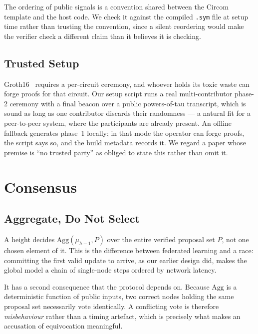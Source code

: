 \documentclass{llncs}
\begin{document}
The ordering of public signals is a convention shared between the Circom
template and the host code. We check it against the compiled \texttt{.sym} file
at setup time rather than trusting the convention, since a silent reordering
would make the verifier check a different claim than it believes it is checking.

\subsection{Trusted Setup}

Groth16~\cite{groth2016size} requires a per-circuit ceremony, and whoever holds
its toxic waste can forge proofs for that circuit. Our setup script runs a real
multi-contributor phase-2 ceremony with a final beacon over a public
powers-of-tau transcript, which is sound as long as one contributor discards
their randomness --- a natural fit for a peer-to-peer system, where the
participants are already present. An offline fallback generates phase~1 locally;
in that mode the operator can forge proofs, the script says so, and the build
metadata records it. We regard a paper whose premise is ``no trusted party''
as obliged to state this rather than omit it.

\section{Consensus}
\label{sec:consensus}

\subsection{Aggregate, Do Not Select}

A height decides $\mathrm{Agg}(\mu_{h-1}, P)$ over the entire verified proposal
set $P$, not one chosen element of it. This is the difference between federated
learning and a race: committing the first valid update to arrive, as our earlier
design did, makes the global model a chain of single-node steps ordered by
network latency.

It has a second consequence that the protocol depends on. Because $\mathrm{Agg}$
is a deterministic function of public inputs, two correct nodes holding the same
proposal set necessarily vote identically. A conflicting vote is therefore
\emph{misbehaviour} rather than a timing artefact, which is precisely what makes
an accusation of equivocation meaningful.
\end{document}
